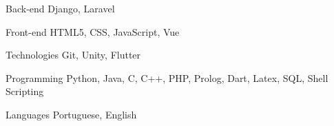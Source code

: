 
\begin{cvskills}
	\cvskill
		{Back-end}
		{Django, Laravel}

	\cvskill
		{Front-end} 
		{HTML5, CSS, JavaScript, Vue} 
		
	\cvskill
		{Technologies}
		{Git, Unity, Flutter}

	\cvskill
		{Programming}
		{Python, Java, C, C++, PHP, Prolog, Dart, Latex, SQL, Shell Scripting} 

	\cvskill
		{Languages}
		{Portuguese, English} 
\end{cvskills}

